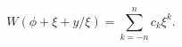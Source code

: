 \begin{equation}
W(\phi + \xi + y / \xi) = \sum \limits_{k=-n}^{n} c_k \xi^k.
\label{WLaurent}
\end{equation}

